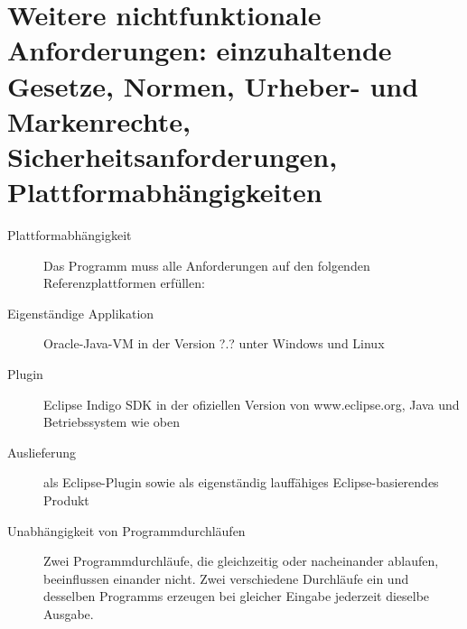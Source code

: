 \section{Weitere nichtfunktionale Anforderungen: einzuhaltende Gesetze, Normen, Urheber- und Markenrechte, Sicherheitsanforderungen, Plattformabhängigkeiten}%

\begin{description}%
    \item [Plattformabhängigkeit] Das Programm muss alle Anforderungen auf den folgenden Referenzplattformen erfüllen:
    \item [Eigenständige Applikation] Oracle-Java-VM in der Version ?.? unter Windows und Linux
    \item [Plugin] Eclipse Indigo SDK in der ofiziellen Version von www.eclipse.org, Java und Betriebssystem wie oben
    \item [Auslieferung] als Eclipse-Plugin sowie als eigenständig lauffähiges Eclipse-basierendes Produkt
    \item [Unabhängigkeit von Programmdurchläufen] Zwei Programmdurchläufe, die gleichzeitig oder nacheinander ablaufen, beeinflussen einander nicht. Zwei verschiedene Durchläufe ein und desselben Programms erzeugen bei gleicher Eingabe jederzeit dieselbe Ausgabe.
\end{description}%
